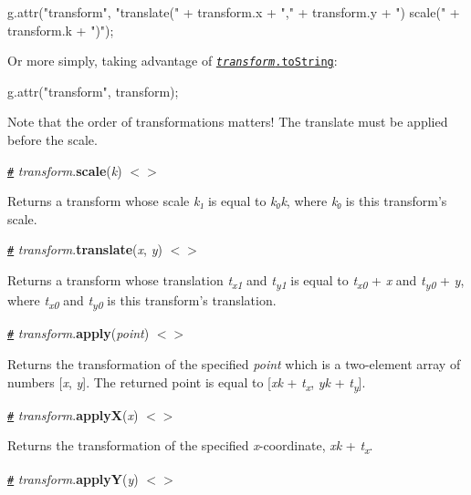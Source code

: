 \begin{DoxyCode}
g.attr("transform", "translate(" + transform.x + "," + transform.y + ") scale(" + transform.k + ")");
\end{DoxyCode}


Or more simply, taking advantage of \href{#transform_toString}{\tt {\itshape transform}.to\+String}\+:


\begin{DoxyCode}
g.attr("transform", transform);
\end{DoxyCode}


Note that the order of transformations matters! The translate must be applied before the scale.

\href{#transform_scale}{\tt \#} {\itshape transform}.{\bfseries scale}({\itshape k}) \href{https://github.com/d3/d3-zoom/blob/master/src/transform.js#L9}{\tt $<$$>$}

Returns a transform whose scale {\itshape k₁} is equal to {\itshape k₀k}, where {\itshape k₀} is this transform’s scale.

\href{#transform_translate}{\tt \#} {\itshape transform}.{\bfseries translate}({\itshape x}, {\itshape y}) \href{https://github.com/d3/d3-zoom/blob/master/src/transform.js#L12}{\tt $<$$>$}

Returns a transform whose translation {\itshape t\textsubscript{x1}} and {\itshape t\textsubscript{y1}} is equal to {\itshape t\textsubscript{x0}} + {\itshape x} and {\itshape t\textsubscript{y0}} + {\itshape y}, where {\itshape t\textsubscript{x0}} and {\itshape t\textsubscript{y0}} is this transform’s translation.

\href{#transform_apply}{\tt \#} {\itshape transform}.{\bfseries apply}({\itshape point}) \href{https://github.com/d3/d3-zoom/blob/master/src/transform.js#L15}{\tt $<$$>$}

Returns the transformation of the specified {\itshape point} which is a two-\/element array of numbers \mbox{[}{\itshape x}, {\itshape y}\mbox{]}. The returned point is equal to \mbox{[}{\itshape xk} + {\itshape t\textsubscript{x}}, {\itshape yk} + {\itshape t\textsubscript{y}}\mbox{]}.

\href{#transform_applyX}{\tt \#} {\itshape transform}.{\bfseries applyX}({\itshape x}) \href{https://github.com/d3/d3-zoom/blob/master/src/transform.js#L18}{\tt $<$$>$}

Returns the transformation of the specified {\itshape x}-\/coordinate, {\itshape xk} + {\itshape t\textsubscript{x}}.

\href{#transform_applyY}{\tt \#} {\itshape transform}.{\bfseries applyY}({\itshape y}) \href{https://github.com/d3/d3-zoom/blob/master/src/transform.js#L21}{\tt $<$$>$}


